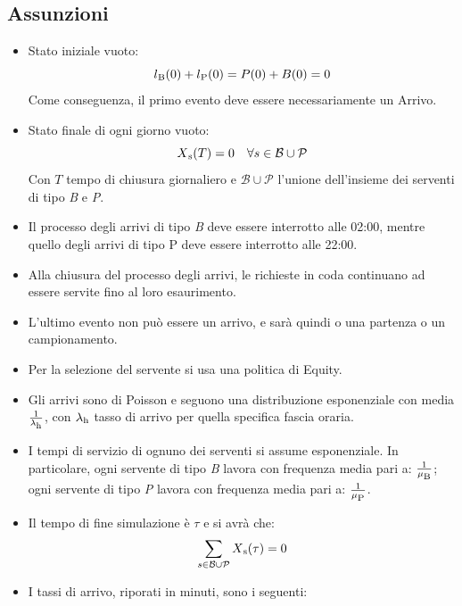 \documentclass[a4paper, 12pt]{article}
\begin{document}
\subsection{Assunzioni}
\begin{itemize}
  \item Stato iniziale vuoto: 
  \[ 
    l\textsubscript{B}(0) + l\textsubscript{P}(0) = P(0) + B(0) = 0 
\]
  Come conseguenza, il primo evento deve essere necessariamente un Arrivo.
  \item Stato finale di ogni giorno vuoto:
\[
    X\textsubscript{s}(T) = 0\ \ \ \forall s \in \mathcal{B} \cup \mathcal{P}
\]
  Con $T$ tempo di chiusura giornaliero e $\mathcal{B} \cup \mathcal{P}$ l'unione dell'insieme dei serventi di tipo \textit{B} e \textit{P}.

  \item Il processo degli arrivi di tipo \textit{B} deve essere interrotto alle 02:00,
mentre quello degli arrivi di tipo P deve essere interrotto alle 22:00.
  
  \item Alla chiusura del processo degli arrivi, le richieste in coda
continuano ad essere servite fino al loro esaurimento.

  \item L'ultimo evento non può essere un arrivo, e sarà quindi o una partenza
o un campionamento.

  \item Per la selezione del servente si usa una politica di Equity.

  \item Gli arrivi sono di Poisson e seguono una distribuzione esponenziale
con media $\frac{1}{\lambda\textsubscript{h}}$, con $\lambda\textsubscript{h}$ tasso di arrivo per quella
specifica fascia oraria.

  \item I tempi di servizio di ognuno dei serventi si assume  esponenziale. In particolare, ogni servente di tipo \textit{B} lavora con frequenza media pari a: $\frac{1}{\mu\textsubscript{B}}$; ogni servente di tipo \textit{P} lavora con frequenza media pari a: $\frac{1}{\mu\textsubscript{P}}$.

  \item Il tempo di fine simulazione è $\tau$ e si avrà che:
\[
  \sum_{s \in \mathcal{B} \cup \mathcal{P}}X\textsubscript{s}(\tau) = 0
\]

\newpage
  \item I tassi di arrivo, riporati in minuti, sono i seguenti:


\end{itemize}
\end{document}
